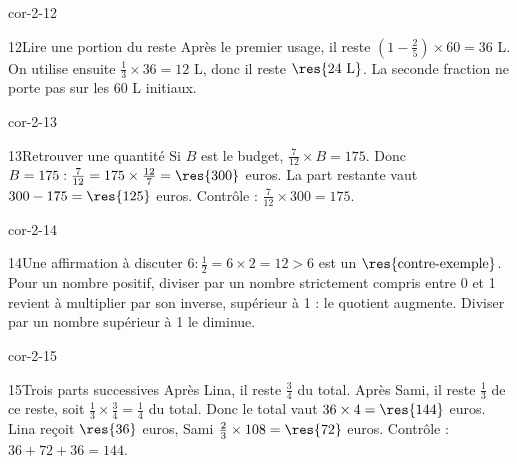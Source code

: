 \begin{blocLivre}{cor-2-12}\begin{corrige}{12}{Lire une portion du reste}
Après le premier usage, il reste $\left(1-\frac25\right)\times60=36$ L. On utilise ensuite $\frac13\times36=12$ L, donc il reste $\res{24\ \mathrm L}$. La seconde fraction ne porte pas sur les 60 L initiaux.
\end{corrige}\end{blocLivre}
\begin{blocLivre}{cor-2-13}\begin{corrige}{13}{Retrouver une quantité}
Si $B$ est le budget, $\frac7{12}\times B=175$. Donc $B=175:\frac7{12}=175\times\frac{12}7=\res{300}$ euros. La part restante vaut $300-175=\res{125}$ euros. Contrôle : $\frac7{12}\times300=175$.
\end{corrige}\end{blocLivre}
\begin{blocLivre}{cor-2-14}\begin{corrige}{14}{Une affirmation à discuter}
$6:\frac12=6\times2=12>6$ est un $\res{\text{contre-exemple}}$. Pour un nombre positif, diviser par un nombre strictement compris entre 0 et 1 revient à multiplier par son inverse, supérieur à 1 : le quotient augmente. Diviser par un nombre supérieur à 1 le diminue.
\end{corrige}\end{blocLivre}
\begin{blocLivre}{cor-2-15}\begin{corrige}{15}{Trois parts successives}
Après Lina, il reste $\frac34$ du total. Après Sami, il reste $\frac13$ de ce reste, soit $\frac13\times\frac34=\frac14$ du total. Donc le total vaut $36\times4=\res{144}$ euros. Lina reçoit $\res{36}$ euros, Sami $\frac23\times108=\res{72}$ euros. Contrôle : $36+72+36=144$.
\end{corrige}\end{blocLivre}
